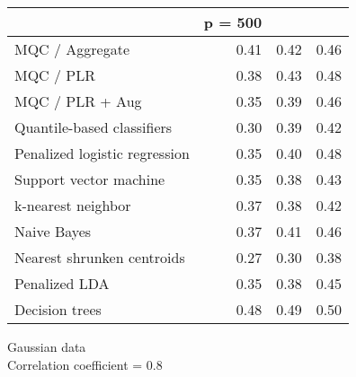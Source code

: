 \begin{table}[p]
\begin{minipage}{0.49\textwidth}
{\begin{tabular}{lrrr}
        \hline
        & p = 500 \\
        \hline

        MQC / Aggregate & 0.41 & 0.42 & 0.46 \\ 
        MQC / PLR & 0.38 & 0.43 & 0.48 \\ 
        MQC / PLR + Aug & 0.35 & 0.39 & 0.46 \\ 
        Quantile-based classifiers & 0.30 & 0.39 & 0.42 \\ 
        Penalized logistic regression & 0.35 & 0.40 & 0.48 \\ 
        Support vector machine & 0.35 & 0.38 & 0.43 \\ 
        k-nearest neighbor & 0.37 & 0.38 & 0.42 \\ 
        Naive Bayes & 0.37 & 0.41 & 0.46 \\ 
        Nearest shrunken centroids & 0.27 & 0.30 & 0.38 \\ 
        Penalized LDA & 0.35 & 0.38 & 0.45 \\ 
        Decision trees & 0.48 & 0.49 & 0.50 \\ 
        \hline
      \end{tabular}
    }
  \end{minipage}
  \begin{minipage}{0.49\textwidth}
    \centering
    Gaussian data \\
    Correlation coefficient = 0.8 \\[2ex]
\end{minipage}
\end{table}
